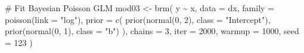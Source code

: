 \documentclass[
  13,
  letterpaper,
]{report}
\newenvironment{Shaded}{\begin{snugshade}}{\end{snugshade}}
\newcommand{\AttributeTok}[1]{\textcolor[rgb]{0.40,0.45,0.13}{#1}}
\newcommand{\CommentTok}[1]{\textcolor[rgb]{0.37,0.37,0.37}{#1}}
\newcommand{\DecValTok}[1]{\textcolor[rgb]{0.68,0.00,0.00}{#1}}
\newcommand{\FunctionTok}[1]{\textcolor[rgb]{0.28,0.35,0.67}{#1}}
\newcommand{\NormalTok}[1]{\textcolor[rgb]{0.00,0.23,0.31}{#1}}
\newcommand{\OtherTok}[1]{\textcolor[rgb]{0.00,0.23,0.31}{#1}}
\newcommand{\SpecialCharTok}[1]{\textcolor[rgb]{0.37,0.37,0.37}{#1}}
\newcommand{\StringTok}[1]{\textcolor[rgb]{0.13,0.47,0.30}{#1}}
\begin{document}
\begin{Shaded}
\begin{Highlighting}[]
\CommentTok{\# Fit Bayesian Poisson GLM}
\NormalTok{mod03 }\OtherTok{\textless{}{-}} \FunctionTok{brm}\NormalTok{(}
\NormalTok{  y }\SpecialCharTok{\textasciitilde{}}\NormalTok{ x,}
  \AttributeTok{data =}\NormalTok{ dx,}
  \AttributeTok{family =} \FunctionTok{poisson}\NormalTok{(}\AttributeTok{link =} \StringTok{"log"}\NormalTok{),}
  \AttributeTok{prior =} \FunctionTok{c}\NormalTok{(}
    \FunctionTok{prior}\NormalTok{(}\FunctionTok{normal}\NormalTok{(}\DecValTok{0}\NormalTok{, }\DecValTok{2}\NormalTok{), }\AttributeTok{class =} \StringTok{"Intercept"}\NormalTok{),}
    \FunctionTok{prior}\NormalTok{(}\FunctionTok{normal}\NormalTok{(}\DecValTok{0}\NormalTok{, }\DecValTok{1}\NormalTok{), }\AttributeTok{class =} \StringTok{"b"}\NormalTok{)}
\NormalTok{  ),}
  \AttributeTok{chains =} \DecValTok{3}\NormalTok{,}
  \AttributeTok{iter =} \DecValTok{2000}\NormalTok{,}
  \AttributeTok{warmup =} \DecValTok{1000}\NormalTok{,}
  \AttributeTok{seed =} \DecValTok{123}
\NormalTok{)}
\end{Highlighting}
\end{Shaded}
\end{document}
